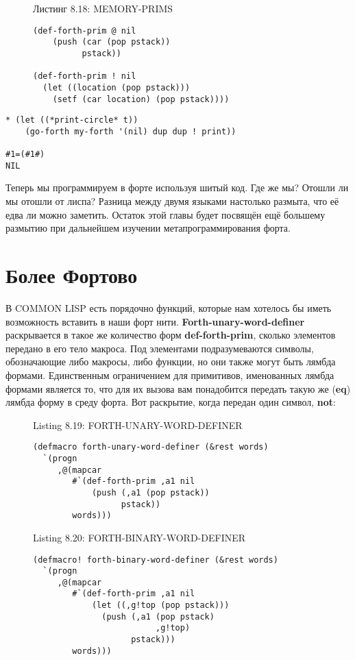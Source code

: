 \begin{figure}Листинг 8.18: MEMORY-PRIMS\label{listing_8.18}
\listbegin
\begin{verbatim}
(def-forth-prim @ nil
    (push (car (pop pstack))
          pstack))

(def-forth-prim ! nil
  (let ((location (pop pstack)))
    (setf (car location) (pop pstack))))
\end{verbatim}
\listend
\end{figure}

\begin{verbatim}
* (let ((*print-circle* t))
    (go-forth my-forth '(nil) dup dup ! print))

#1=(#1#) 
NIL
\end{verbatim}

Теперь мы программируем в форте используя шитый код. Где же мы? Отошли ли мы отошли от лиспа? Разница между двумя языками настолько размыта, что её едва ли можно заметить. Остаток этой главы будет посвящён ещё большему размытию при дальнейшем изучении метапрограммирования форта.

\section{Более Фортово}\label{section_going_forther}

В COMMON LISP есть порядочно функций, которые нам хотелось бы иметь возможность вставить в наши форт нити. \textbf{Forth-unary-word-definer} раскрывается в такое же количество форм \textbf{def-forth-prim}, сколько элементов передано в его тело макроса. Под элементами подразумеваются символы,  обозначающие либо макросы, либо функции, но они также могут быть лямбда формами. Единственным ограничением для примитивов, именованных лямбда формами является то, что для их вызова вам понадобится передать такую же (\textbf{eq}) лямбда форму в среду форта. Вот раскрытие, когда передан один символ, \textbf{not}: 

\begin{figure}Listing 8.19: FORTH-UNARY-WORD-DEFINER\label{listing_8.19}
\listbegin
\begin{verbatim}
(defmacro forth-unary-word-definer (&rest words)
  `(progn
     ,@(mapcar
        #`(def-forth-prim ,a1 nil
            (push (,a1 (pop pstack))
                  pstack))
        words)))
\end{verbatim}
\listend
\end{figure}

\begin{figure}Listing 8.20: FORTH-BINARY-WORD-DEFINER\label{listing_8.20}
\listbegin
\begin{verbatim}
(defmacro! forth-binary-word-definer (&rest words)
  `(progn
     ,@(mapcar
        #`(def-forth-prim ,a1 nil
            (let ((,g!top (pop pstack)))
              (push (,a1 (pop pstack)
                         ,g!top)
                    pstack)))
        words)))
\end{verbatim}
\listend
\end{figure}

